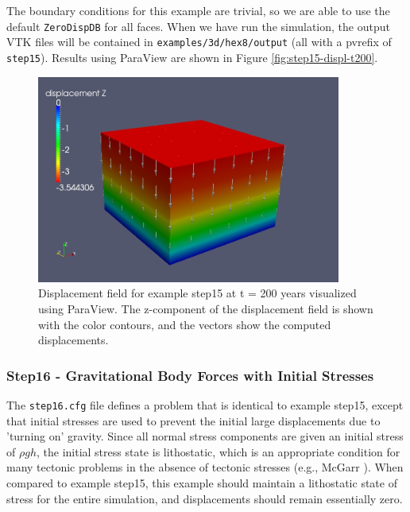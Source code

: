 The boundary conditions for this example are trivial, so we are able
to use the default \texttt{ZeroDispDB} for all faces. When we have
run the simulation, the output VTK files will be contained in \texttt{examples/3d/hex8/output}
(all with a pvrefix of \texttt{step15}). Results using ParaView are
shown in Figure \vref{fig:step15-displ-t200}.

\begin{figure}
\begin{centering}
\includegraphics[width=10cm]{tutorials/3dhex8/figs/step15-displ-t200}
\par\end{centering}

\caption{Displacement field for example step15 at t = 200 years visualized
using ParaView. The z-component of the displacement field is shown
with the color contours, and the vectors show the computed displacements.\label{fig:step15-displ-t200}}


\end{figure}



\subsubsection{Step16 - Gravitational Body Forces with Initial Stresses}

The \texttt{step16.cfg} file defines a problem that is identical to
example step15, except that initial stresses are used to prevent the
initial large displacements due to 'turning on' gravity. Since all
normal stress components are given an initial stress of $\rho gh$,
the initial stress state is lithostatic, which is an appropriate condition
for many tectonic problems in the absence of tectonic stresses (e.g.,
McGarr \cite{McGarr:1988}). When compared to example step15, this
example should maintain a lithostatic state of stress for the entire
simulation, and displacements should remain essentially zero.

